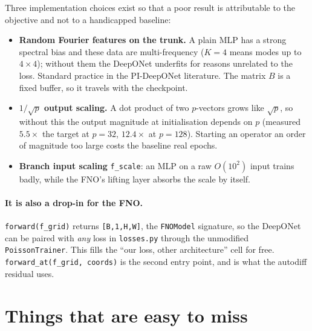 \documentclass[11pt]{article}
\begin{document}
Three implementation choices exist so that a poor result is attributable to the objective and not to
a handicapped baseline:
\begin{itemize}
   \item \textbf{Random Fourier features on the trunk.} A plain MLP has a strong spectral bias and
   these data are multi-frequency ($K=4$ means modes up to $4\times4$); without them the DeepONet
   underfits for reasons unrelated to the loss. Standard practice in the PI-DeepONet literature.
   The matrix $B$ is a fixed buffer, so it travels with the checkpoint.
   \item \textbf{$1/\sqrt{p}$ output scaling.} A dot product of two $p$-vectors grows like
   $\sqrt{p}$, so without this the output magnitude at initialisation depends on $p$ (measured
   $5.5\times$ the target at $p=32$, $12.4\times$ at $p=128$). Starting an operator an order of
   magnitude too large costs the baseline real epochs.
   \item \textbf{Branch input scaling} \texttt{f\_scale}: an MLP on a raw $O(10^2)$ input trains
   badly, while the FNO's lifting layer absorbs the scale by itself.
\end{itemize}

\paragraph{It is also a drop-in for the FNO.} \texttt{forward(f\_grid)} returns
\texttt{[B,1,H,W]}, the \texttt{FNOModel} signature, so the DeepONet can be paired with
\emph{any} loss in \texttt{losses.py} through the unmodified \texttt{PoissonTrainer}. This fills the
``our loss, other architecture'' cell for free. \texttt{forward\_at(f\_grid, coords)} is the second
entry point, and is what the autodiff residual uses.

\section*{Things that are easy to miss}
\end{document}
